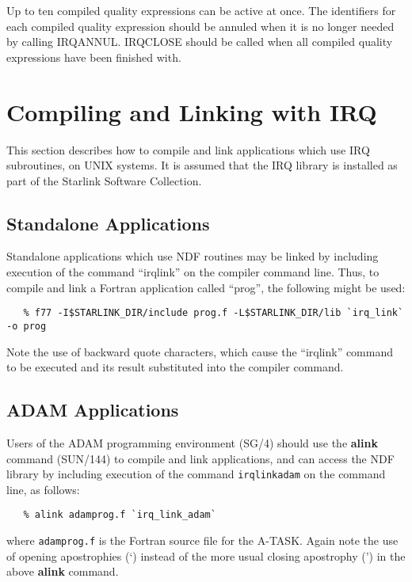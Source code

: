 \documentclass[twoside,11pt]{article}
\newcommand{\htmlref}[2]{#1}
\newcommand{\latex}[1]{#1}
\newcommand{\xref}[3]{#1}
\renewcommand{\_}{\texttt{\symbol{95}}}
\begin{document}
Up to ten compiled quality expressions can be active at once. The
identifiers for each compiled quality expression should be annuled
when it is no longer needed by calling
\htmlref{IRQ\_ANNUL}{IRQ_ANNUL}. \htmlref{IRQ\_CLOSE}{IRQ_CLOSE}
should be called when all compiled quality expressions have been
finished with. 

\section {Compiling and Linking with IRQ}
\label{SEC:LINK}
This section describes how to compile and link applications which use IRQ
subroutines, on UNIX systems. It is assumed that the IRQ library
is installed as part of the Starlink Software Collection.


\subsection{Standalone Applications}
Standalone applications which use NDF\_ routines may be linked by
including execution of the command ``irq\_link'' on the compiler
command line. Thus, to compile and link a Fortran application called
``prog'', the following might be used:

\small
\begin{verbatim}
   % f77 -I$STARLINK_DIR/include prog.f -L$STARLINK_DIR/lib `irq_link` -o prog
\end{verbatim}
\normalsize

Note the use of backward quote characters, which cause the
``irq\_link'' command to be executed and its result substituted into
the compiler command.

\subsection{\label{ss:buildingadamapplications}ADAM Applications}
Users of the \xref{ADAM}{sg4}{} programming environment
\latex{(SG/4)} should use
the \xref{{\bf alink}}{sun144}{ADAM_link_scripts} command
(\xref{SUN/144}{sun144}{}) to compile and link applications, and can
access the NDF\_ library by including execution of the command
{\tt irq\_link\_adam} on the command line, as follows:

\small
\begin{verbatim}
   % alink adamprog.f `irq_link_adam`
\end{verbatim}
\normalsize

where {\tt adamprog.f} is the Fortran source file for the A-TASK. Again
note the use of opening apostrophies (`) instead of the more usual
closing apostrophy (') in the above {\bf alink} command.
\end{document}
